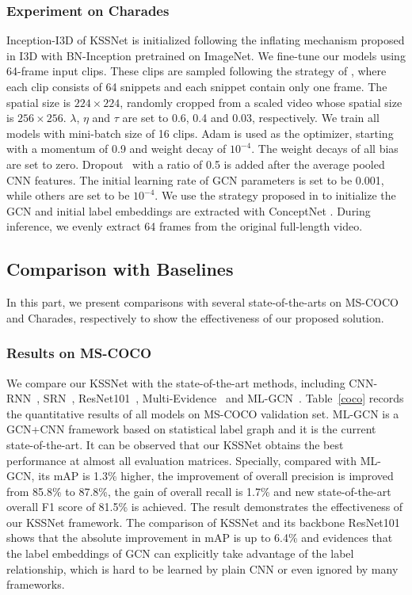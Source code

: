 \documentclass[letterpaper]{article} \usepackage{aaai20}  \usepackage{times}  \usepackage{helvet} \usepackage{courier}  \usepackage[hyphens]{url}  \usepackage{graphicx} \usepackage{subfigure}
\begin{document}
\subsubsection{Experiment on Charades}
Inception-I3D of KSSNet is initialized following the inflating mechanism proposed in I3D \cite{carreira2017quo} with BN-Inception pretrained on ImageNet. We fine-tune our models using 64-frame input clips. These clips are sampled following the strategy of \cite{wang2016temporal}, where each clip consists of 64 snippets and each snippet contain only one frame. The spatial size is $224\times 224$, randomly cropped from a scaled video whose spatial size is $256\times 256$. $\lambda$, $\eta$ and $\tau$ are set to 0.6, 0.4 and 0.03, respectively. We train all models with mini-batch size of 16 clips. Adam is used as the optimizer, starting with a momentum of 0.9 and weight decay of $10^{-4}$. The weight decays of all bias are set to zero. Dropout~\cite{hinton2012improving} with a ratio of 0.5 is added after the average pooled CNN features. The initial learning rate of GCN parameters is set to be 0.001, while others are set to be $10^{-4}$. We use the strategy proposed in \cite{he2015delving} to initialize the GCN and initial label embeddings are extracted with ConceptNet \cite{speer2017conceptnet}.
During inference, we evenly extract 64 frames from the original full-length video.

\subsection{Comparison with Baselines}
In this part, we present comparisons with several state-of-the-arts on MS-COCO and Charades, respectively to show the effectiveness of our proposed solution.

\subsubsection{Results on MS-COCO}  
We compare our KSSNet with the state-of-the-art methods, including CNN-RNN~\cite{wang2016cnn}, SRN~\cite{Zhu_2017_CVPR}, ResNet101~\cite{he2016deep}, Multi-Evidence~\cite{ge2018multi} and ML-GCN~\cite{chen2019multi}. Table~\ref{coco} records the quantitative results of all models on MS-COCO validation set. ML-GCN is a GCN+CNN framework based on statistical label graph and it is the current state-of-the-art. It can be observed that our KSSNet obtains the best performance at almost all evaluation matrices. Specially, compared with ML-GCN, its mAP is 1.3\% higher, the improvement of overall precision is improved from 85.8\% to 87.8\%, the gain of overall recall is 1.7\% and new state-of-the-art overall F1 score of 81.5\% is achieved. The result demonstrates the effectiveness of our KSSNet framework. The comparison of KSSNet and its backbone ResNet101 shows that the absolute improvement in mAP is up to 6.4\% and evidences that the label embeddings of GCN can explicitly take advantage of the label relationship, which is hard to be learned by plain CNN or even ignored by many frameworks.
\end{document}

